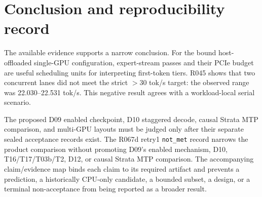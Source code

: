 \documentclass[11pt]{article}
\begin{document}
\section{Conclusion and reproducibility record}

The available evidence supports a narrow conclusion. For the bound host-offloaded single-GPU configuration, expert-stream passes and their PCIe budget are useful scheduling units for interpreting first-token tiers. R045 shows that two concurrent lanes did not meet the strict $>30$ tok/s target: the observed range was 22.030--22.531 tok/s. This negative result agrees with a workload-local serial scenario.

The proposed D09 enabled checkpoint, D10 staggered decode, causal Strata MTP comparison, and multi-GPU layouts must be judged only after their separate sealed acceptance records exist. The R067d retry1 \texttt{not\_met} record narrows the product comparison without promoting D09's enabled mechanism, D10, T16/T17/T03b/T2, D12, or causal Strata MTP comparison. The accompanying claim/evidence map binds each claim to its required artifact and prevents a prediction, a historically CPU-only candidate, a bounded subset, a design, or a terminal non-acceptance from being reported as a broader result.



\end{document}
